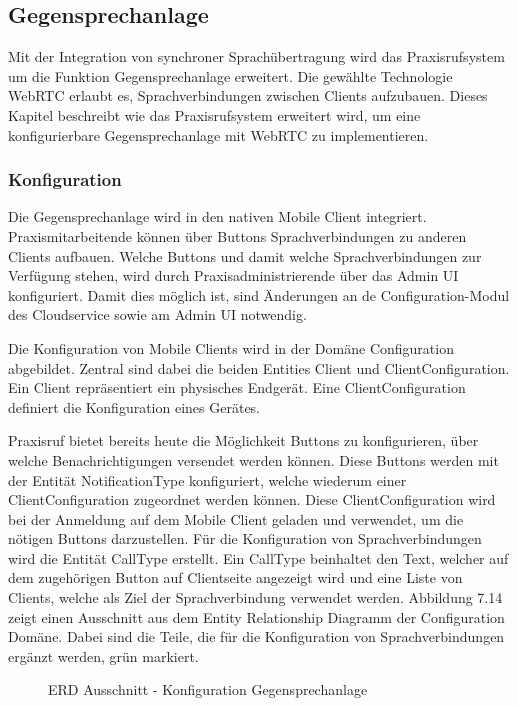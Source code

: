 \subsection{Gegensprechanlage}

Mit der Integration von synchroner Sprachübertragung wird das Praxisrufsystem um die Funktion Gegensprechanlage erweitert.
Die gewählte Technologie WebRTC erlaubt es, Sprachverbindungen zwischen Clients aufzubauen.
Dieses Kapitel beschreibt wie das Praxisrufsystem erweitert wird, um eine konfigurierbare Gegensprechanlage mit WebRTC zu implementieren.

\subsubsection{Konfiguration}

Die Gegensprechanlage wird in den nativen Mobile Client integriert.
Praxismitarbeitende können über Buttons Sprachverbindungen zu anderen Clients aufbauen.
Welche Buttons und damit welche Sprachverbindungen zur Verfügung stehen, wird durch Praxisadministrierende über das Admin UI konfiguriert.
Damit dies möglich ist, sind Änderungen an de Configuration-Modul des Cloudservice sowie am Admin UI notwendig.

Die Konfiguration von Mobile Clients wird in der Domäne Configuration abgebildet.
Zentral sind dabei die beiden Entities Client und ClientConfiguration.
Ein Client repräsentiert ein physisches Endgerät.
Eine ClientConfiguration definiert die Konfiguration eines Gerätes.

Praxisruf bietet bereits heute die Möglichkeit Buttons zu konfigurieren, über welche Benachrichtigungen versendet werden können.
Diese Buttons werden mit der Entität NotificationType konfiguriert, welche wiederum einer ClientConfiguration zugeordnet werden können.
Diese ClientConfiguration wird bei der Anmeldung auf dem Mobile Client geladen und verwendet, um die nötigen Buttons darzustellen.
Für die Konfiguration von Sprachverbindungen wird die Entität CallType erstellt.
Ein CallType beinhaltet den Text, welcher auf dem zugehörigen Button auf Clientseite angezeigt wird und eine Liste von Clients, welche als Ziel der Sprachverbindung verwendet werden.
Abbildung 7.14 zeigt einen Ausschnitt aus dem Entity Relationship Diagramm der Configuration Domäne.
Dabei sind die Teile, die für die Konfiguration von Sprachverbindungen ergänzt werden, grün markiert.

\begin{figure}[h]
    \centering
    \begin{minipage}[b]{0.7\textwidth}
        \caption{ERD Ausschnitt - Konfiguration Gegensprechanlage}
    \end{minipage}
\end{figure}

